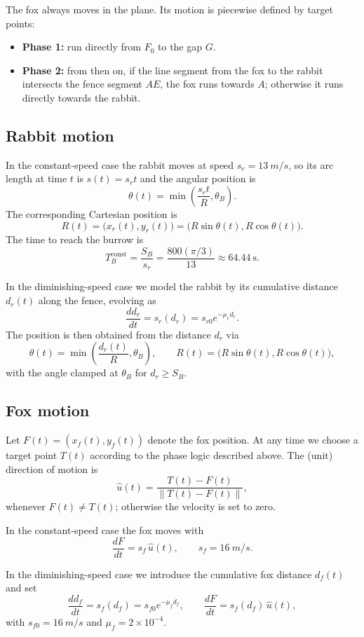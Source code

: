 \documentclass[a4paper,11pt]{article}
\begin{document}
The fox always moves in the plane. Its motion is piecewise defined by target points:
\begin{itemize}
  \item \textbf{Phase 1:} run directly from $F_0$ to the gap $G$.
  \item \textbf{Phase 2:} from then on, if the line segment from the fox to the rabbit intersects the fence segment $AE$, the fox runs towards $A$; otherwise it runs directly towards the rabbit.
\end{itemize}

\subsection{Rabbit motion}

In the constant-speed case the rabbit moves at speed $s_r=\SI{13}{m/s}$, so its arc length at time $t$ is $s(t)=s_r t$ and the angular position is
\[
\theta(t) = \min\left(\frac{s_r t}{R},\theta_B\right).
\]
The corresponding Cartesian position is
\[
R(t) = \bigl(x_r(t),y_r(t)\bigr)
       = \bigl(R\sin\theta(t), R\cos\theta(t)\bigr).
\]
The time to reach the burrow is
\[
T_B^{\text{const}} = \frac{S_B}{s_r}
= \frac{800(\pi/3)}{13} \approx \SI{64.44}{\second}.
\]

In the diminishing-speed case we model the rabbit by its cumulative distance $d_r(t)$ along the fence, evolving as
\[
\frac{d d_r}{dt} = s_r(d_r) = s_{r0} e^{-\mu_r d_r}.
\]
The position is then obtained from the distance $d_r$ via
\[
\theta(t) = \min\left(\frac{d_r(t)}{R},\theta_B\right), \qquad
R(t)= \bigl(R\sin\theta(t),R\cos\theta(t)\bigr),
\]
with the angle clamped at $\theta_B$ for $d_r\ge S_B$.

\subsection{Fox motion}

Let $F(t)=(x_f(t),y_f(t))$ denote the fox position. At any time we choose a target point $T(t)$ according to the phase logic described above. The (unit) direction of motion is
\[
\hat{u}(t) = \frac{T(t)-F(t)}{\|T(t)-F(t)\|},
\]
whenever $F(t)\neq T(t)$; otherwise the velocity is set to zero.

In the constant-speed case the fox moves with
\[
\frac{dF}{dt} = s_f\,\hat{u}(t), \qquad s_f = \SI{16}{m/s}.
\]

In the diminishing-speed case we introduce the cumulative fox distance $d_f(t)$ and set
\[
\frac{d d_f}{dt} = s_f(d_f) = s_{f0} e^{-\mu_f d_f},\qquad
\frac{dF}{dt} = s_f(d_f)\,\hat{u}(t),
\]
with $s_{f0}=\SI{16}{m/s}$ and $\mu_f=2\times 10^{-4}$.
\end{document}
